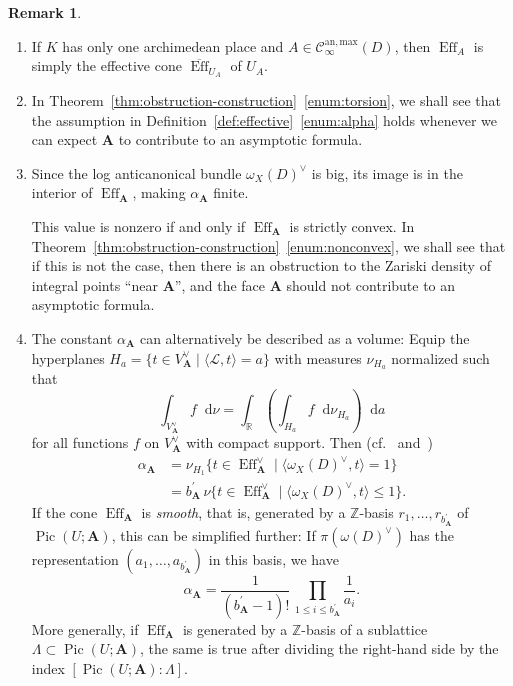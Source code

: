 \documentclass[a4paper, twoside, 10pt]{amsart}
\newcommand*\diff{\mathop{}\!\mathrm{d}}
\newcommand{\uA}{{\boldsymbol{A}}}
\newcommand{\cC}{\mathcal{C}}
\newcommand{\cL}{\mathcal{L}}
\newcommand{\RR}{\mathbb{R}}
\newcommand{\ZZ}{\mathbb{Z}}
\newcommand{\Canmax}{\cC^{\mathrm{an,max}}}
\DeclareMathOperator{\Eff}{Eff}
\DeclareMathOperator{\Pic}{Pic}
\theoremstyle{definition}
\newtheorem{remark}[theorem]{Remark}
\begin{document}
\begin{remark}
  \leavevmode

  \begin{enumerate}
    \item If $K$ has only one archimedean place and $A\in \Canmax_\infty(D)$, then $\Eff_A$ is simply the effective cone $\overline{\Eff}_{U_A}$ of $U_A$.
  
    \item In Theorem~\ref{thm:obstruction-construction}~\eqref{enum:torsion}, we shall see that the assumption in Definition~\ref{def:effective}~\eqref{enum:alpha} holds whenever we can expect $\uA$ to contribute to an asymptotic formula.
    
    \item Since the log anticanonical bundle $\omega_X(D)^\vee$ is big, its image is in the interior of $\Eff_\uA$, making $\alpha_\uA$ finite.
    
    This value is nonzero if and only if $\Eff_\uA$ is strictly convex. In Theorem~\ref{thm:obstruction-construction}~\eqref{enum:nonconvex}, we shall see that if this is not the case, then there is an obstruction to the Zariski density of integral points ``near $\uA$'', and the face $\uA$ should not contribute to an asymptotic formula.
    
    \item The constant $\alpha_\uA$ can alternatively be described as a volume: Equip the hyperplanes $H_a=\{t\in V_\uA^\vee\mid\langle\cL,t \rangle=a\}$ with measures $\nu_{H_a}$ normalized such that
    \[
      \int_{V_\uA^\vee} f \diff\nu  = \int_\RR  \left(\int_{H_a} f \diff \nu_{H_a}\right) \diff a
    \]
    for all functions $f$ on $V_\uA^\vee$ with compact support.
    Then (cf.~\cite[Ch.~2,~\S\,2]{MR0158414} and~\cite[Prop.~5.3]{MR1620682})
    \begin{align*}
      \alpha_\uA
      & = \nu_{H_1}\{t\in \Eff_\uA^\vee \mid
               \langle \omega_X(D)^\vee, t\rangle = 1 \}\\
      & = b_\uA^\prime\,
          \nu\{t\in \Eff_\uA^\vee \mid
               \langle \omega_X(D)^\vee, t\rangle \le  1 \}.
    \end{align*}
    If the cone $\Eff_\uA$ is \emph{smooth}, that is, generated by a $\ZZ$-basis $r_1,\dots,r_{b_\uA^\prime}$ of $\Pic(U;\uA)$, this can be simplified further: If $\pi(\omega(D)^\vee)$ has the representation $(a_1,\dots,a_{b_\uA^\prime})$ in this basis, we have
    \[
      \alpha_\uA = \frac{1}{(b_{\uA}^\prime-1)!} \,
      \prod_{1\le i \le b_\uA^\prime} \frac{1}{a_i}.
    \]
    More generally, if $\Eff_\uA$ is generated by a $\ZZ$-basis of a sublattice $\Lambda\subset \Pic(U;\uA)$, the same is true after dividing the right-hand side by the index $[\Pic(U;\uA):\Lambda]$.
  \end{enumerate}
\end{remark}
\end{document}
